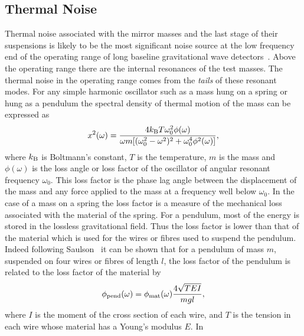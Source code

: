 \documentclass{article}
\begin{document}

\subsection{Thermal Noise}
\label{subsection:thermal}

Thermal noise associated with the mirror masses and the last stage of
their suspensions is likely to be the most significant noise source at
the low frequency end of the operating range of long baseline
gravitational wave detectors~\cite{Saulson2}. Above the operating
range there are the internal resonances of the test masses. The
thermal noise in the operating range comes from the {\em tails} of
these resonant modes. For any simple harmonic oscillator such as a
mass hung on a spring or hung as a pendulum the spectral density of
thermal motion of the mass can be expressed as~\cite{Saulson2}
%
\begin{equation}
  x^{2}(\omega) = \frac{4 k_{\rm B} T \omega_{0}^{2}
  \phi(\omega)}{\omega m [{(\omega_{0}^{2} - \omega^{2})^2 +
  \omega_{0}^{4} \phi^{2}(\omega)}]},
  \label{equation:thnoise}
\end{equation}
%
where $k_{\rm B}$ is Boltmann's constant, $T$ is the temperature, $m$
is the mass and  $\phi(\omega)$ is the loss angle or loss factor of the
oscillator of angular resonant frequency $\omega_0$. 
This loss factor is the phase lag angle between the displacement of the
mass and any force applied to the mass at a frequency well below $\omega_0$.
In the case of a mass on a spring the loss factor is a measure of the
mechanical loss associated with the material of the spring. For a
pendulum, most of the energy is stored in the lossless gravitational
field. Thus the loss factor is lower than that of the material which
is used for the wires or fibres used to suspend the pendulum. Indeed
following Saulson~\cite{Saulson2} it can be shown that for a pendulum
of mass $m$, suspended on four wires or fibres of length $l$, the loss
factor of the pendulum is related to the loss factor of the material
by
%
\begin{equation}
  \phi_{\rm pend}(\omega) = \phi_{\rm mat}(\omega)\frac{4
  \sqrt{TEI}}{mgl},
  \label{equation:pend}
\end{equation}
%
where $I$ is the moment of the cross section of  each wire, and $T$ is
the tension in each wire whose material has a Young's modulus $E$. In
\end{document}
